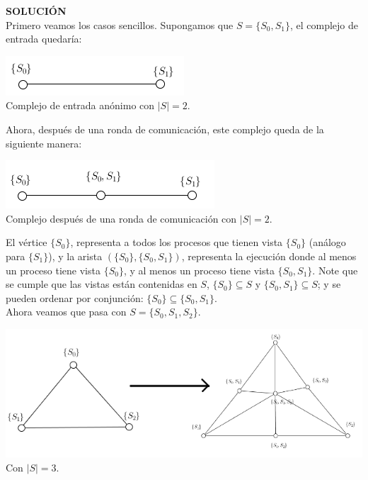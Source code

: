 \documentclass{article}
\begin{document}
\begin{enumerate}
{    \textbf{SOLUCIÓN}\\
    Primero veamos los casos sencillos. Supongamos que $S = \{S_{0}, S_{1}\}$, el complejo de entrada
    quedaría:\\
    \begin{center}
      \includegraphics[scale=0.5]{input.png}
      \\\tiny{Complejo de entrada anónimo con $|S| = 2$.}
    \end{center}
    Ahora, después de una ronda de comunicación, este complejo queda de la siguiente manera:\\
    \begin{center}
      \includegraphics[scale=0.5]{input_1.png}
      \\\tiny{Complejo después de una ronda de comunicación con $|S| = 2$.}
    \end{center}
    El vértice $\{S_{0}\}$, representa a todos los procesos que tienen vista $\{S_{0}\}$ (análogo para $\{S_{1}\}$),
    y la arista $(\{S_{0}\}, \{S_{0},S_{1}\})$, representa la ejecución donde al menos un proceso tiene vista
    $\{S_{0}\}$, y al menos un proceso tiene vista $\{S_{0}, S_{1}\}$.
    Note que se cumple que las vistas están contenidas en $S$, $\{S_{0}\} \subseteq S$ y $\{S_{0},S_{1}\} \subseteq S$; y se pueden
    ordenar por conjunción: $\{S_{0}\} \subseteq \{S_{0},S_{1}\}$.\\
    Ahora veamos que pasa con $S = \{S_{0}, S_{1}, S_{2}\}$.\\
    \begin{center}
      \includegraphics[scale=0.5]{input_2.png}
      \\\tiny{Con $|S| = 3$.}

\end{center}}
\end{enumerate}
\end{document}
